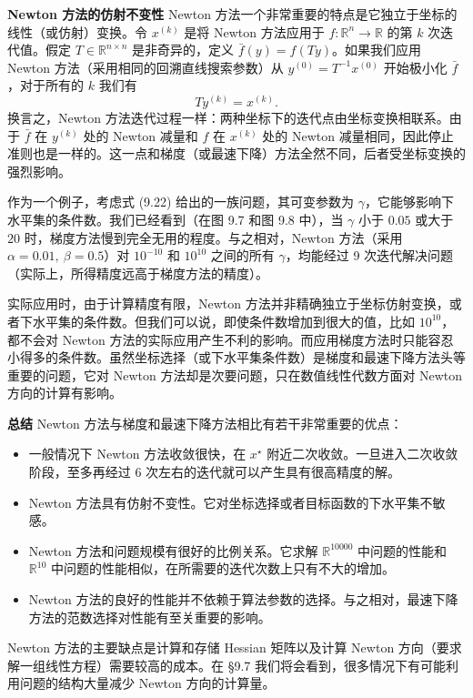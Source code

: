 \documentclass[UTF8,12pt,a4paper,fontset=fandol]{ctexart}
\begin{document}
\noindent\textbf{Newton 方法的仿射不变性}\quad
Newton 方法一个非常重要的特点是它独立于坐标的线性（或仿射）变换。令 $x^{(k)}$ 是将 Newton 方法应用于 $f:\mathbb{R}^n\to\mathbb{R}$ 的第 $k$ 次迭代值。假定 $T\in\mathbb{R}^{n\times n}$ 是非奇异的，定义 $\bar{f}(y)=f(Ty)$。如果我们应用 Newton 方法（采用相同的回溯直线搜索参数）从 $y^{(0)}=T^{-1}x^{(0)}$ 开始极小化 $\bar{f}$，对于所有的 $k$ 我们有
\[
Ty^{(k)}=x^{(k)}.
\]
换言之，Newton 方法迭代过程一样：两种坐标下的迭代点由坐标变换相联系。由于 $\bar{f}$ 在 $y^{(k)}$ 处的 Newton 减量和 $f$ 在 $x^{(k)}$ 处的 Newton 减量相同，因此停止准则也是一样的。这一点和梯度（或最速下降）方法全然不同，后者受坐标变换的强烈影响。

作为一个例子，考虑式 (9.22) 给出的一族问题，其可变参数为 $\gamma$，它能够影响下水平集的条件数。我们已经看到（在图 9.7 和图 9.8 中），当 $\gamma$ 小于 $0.05$ 或大于 $20$ 时，梯度方法慢到完全无用的程度。与之相对，Newton 方法（采用 $\alpha=0.01,\ \beta=0.5$）对 $10^{-10}$ 和 $10^{10}$ 之间的所有 $\gamma$，均能经过 9 次迭代解决问题（实际上，所得精度远高于梯度方法的精度）。

实际应用时，由于计算精度有限，Newton 方法并非精确独立于坐标仿射变换，或者下水平集的条件数。但我们可以说，即使条件数增加到很大的值，比如 $10^{10}$，都不会对 Newton 方法的实际应用产生不利的影响。而应用梯度方法时只能容忍小得多的条件数。虽然坐标选择（或下水平集条件数）是梯度和最速下降方法头等重要的问题，它对 Newton 方法却是次要问题，只在数值线性代数方面对 Newton 方向的计算有影响。

\noindent\textbf{总结}\quad
Newton 方法与梯度和最速下降方法相比有若干非常重要的优点：
\begin{itemize}
\item 一般情况下 Newton 方法收敛很快，在 $x^\star$ 附近二次收敛。一旦进入二次收敛阶段，至多再经过 6 次左右的迭代就可以产生具有很高精度的解。
\item Newton 方法具有仿射不变性。它对坐标选择或者目标函数的下水平集不敏感。
\item Newton 方法和问题规模有很好的比例关系。它求解 $\mathbb{R}^{10000}$ 中问题的性能和 $\mathbb{R}^{10}$ 中问题的性能相似，在所需要的迭代次数上只有不大的增加。
\item Newton 方法的良好的性能并不依赖于算法参数的选择。与之相对，最速下降方法的范数选择对性能有至关重要的影响。
\end{itemize}

Newton 方法的主要缺点是计算和存储 Hessian 矩阵以及计算 Newton 方向（要求解一组线性方程）需要较高的成本。在 \S9.7 我们将会看到，很多情况下有可能利用问题的结构大量减少 Newton 方向的计算量。
\end{document}
